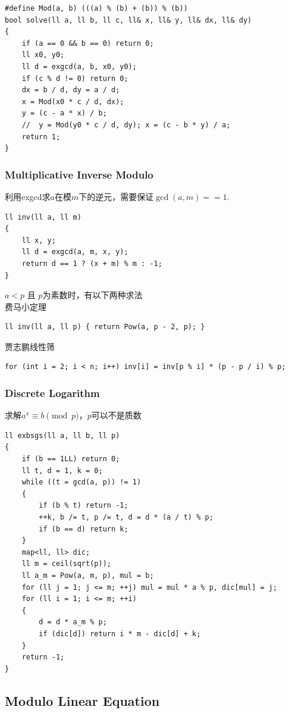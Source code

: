\documentclass[twoside]{article}
\begin{document}
\begin{lstlisting}
#define Mod(a, b) (((a) % (b) + (b)) % (b))
bool solve(ll a, ll b, ll c, ll& x, ll& y, ll& dx, ll& dy)
{
    if (a == 0 && b == 0) return 0;
    ll x0, y0;
    ll d = exgcd(a, b, x0, y0);
    if (c % d != 0) return 0;
    dx = b / d, dy = a / d;
    x = Mod(x0 * c / d, dx);
    y = (c - a * x) / b;
    //  y = Mod(y0 * c / d, dy); x = (c - b * y) / a;
    return 1;
}
\end{lstlisting}

\subsubsection{Multiplicative Inverse Modulo}

利用exgcd求$a$在模$m$下的逆元，需要保证$\gcd(a, m) == 1$.
\begin{lstlisting}
ll inv(ll a, ll m)
{
    ll x, y;
    ll d = exgcd(a, m, x, y);
    return d == 1 ? (x + m) % m : -1;
}
\end{lstlisting}
$a < p$ 且 $p$为素数时，有以下两种求法\\
费马小定理
\begin{lstlisting}
ll inv(ll a, ll p) { return Pow(a, p - 2, p); }
\end{lstlisting}
贾志鹏线性筛
\begin{lstlisting}
for (int i = 2; i < n; i++) inv[i] = inv[p % i] * (p - p / i) % p;
\end{lstlisting}

\subsubsection{Discrete Logarithm}

求解$a ^ x \equiv b \pmod p$，$p$可以不是质数
\begin{lstlisting}
ll exbsgs(ll a, ll b, ll p)
{
    if (b == 1LL) return 0;
    ll t, d = 1, k = 0;
    while ((t = gcd(a, p)) != 1)
    {
        if (b % t) return -1;
        ++k, b /= t, p /= t, d = d * (a / t) % p;
        if (b == d) return k;
    }
    map<ll, ll> dic;
    ll m = ceil(sqrt(p));
    ll a_m = Pow(a, m, p), mul = b;
    for (ll j = 1; j <= m; ++j) mul = mul * a % p, dic[mul] = j;
    for (ll i = 1; i <= m; ++i)
    {
        d = d * a_m % p;
        if (dic[d]) return i * m - dic[d] + k;
    }
    return -1;
}\end{lstlisting}
\subsection{Modulo Linear Equation}
\end{document}
